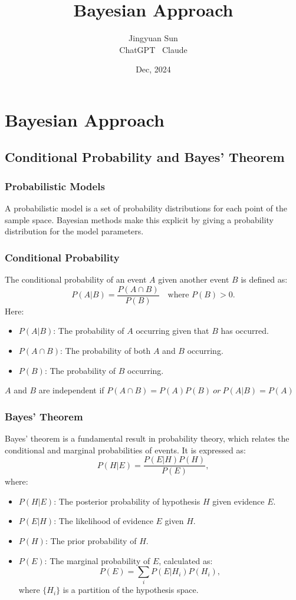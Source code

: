 \documentclass[12pt,a4paper]{article}
\title{\textbf{Bayesian Approach}}
\author{Jingyuan Sun \\ ChatGPT \ Claude}
\date{Dec, 2024}
\begin{document}
\maketitle



\section{Bayesian Approach}

\subsection{Conditional Probability and Bayes’ Theorem}

\subsubsection{Probabilistic Models}
A probabilistic model is a set of probability distributions for each point of the sample space. Bayesian methods make this explicit by giving a probability distribution for the model parameters.

\subsubsection{Conditional Probability}
The conditional probability of an event \( A \) given another event \( B \) is defined as:
\[
P(A|B) = \frac{P(A \cap B)}{P(B)} \quad \text{where } P(B) > 0.
\]
Here:
\begin{itemize}
    \item \( P(A|B) \): The probability of \( A \) occurring given that \( B \) has occurred.
    \item \( P(A \cap B) \): The probability of both \( A \) and \( B \) occurring.
    \item \( P(B) \): The probability of \( B \) occurring.
\end{itemize}


$A$ and $B$ are independent if $P(A\cap B) = P(A)P(B)\  or\ P(A|B) = P(A) $

\subsubsection{Bayes’ Theorem}
Bayes’ theorem is a fundamental result in probability theory, which relates the conditional and marginal probabilities of events. It is expressed as:
\[
P(H|E) = \frac{P(E|H)P(H)}{P(E)},
\]
where:
\begin{itemize}
    \item \( P(H|E) \): The posterior probability of hypothesis \( H \) given evidence \( E \).
    \item \( P(E|H) \): The likelihood of evidence \( E \) given \( H \).
    \item \( P(H) \): The prior probability of \( H \).
    \item \( P(E) \): The marginal probability of \( E \), calculated as:
    \[
    P(E) = \sum_{i} P(E|H_i)P(H_i),
    \]
    where \( \{H_i\} \) is a partition of the hypothesis space.
\end{itemize}
\end{document}
